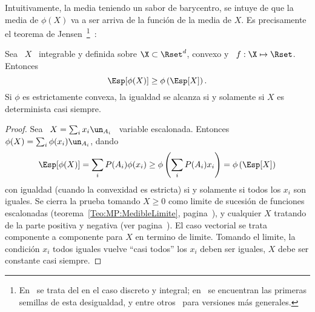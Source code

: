 %
Intuitivamente, la  media teniendo un sabor  de barycentro, se intuye  de que la
media  de $\phi(X)$ va  a ser  arriva de  la funci\'on  de la  media de  $X$. Es
precisamente el  teorema de Jensen~\footnote{En~\cite{Jen06} se trata  del en el
  caso discreto  y integral; en~\cite{Hol89,  Had93} se encuentran  las primeras
  semillas de  esta desigualdad,  y entre otros~\cite{Jes31:I,  Jes31:II, Per74,
    Rud91}  para versiones  m\'as generales.\label{Foot:SZ:Jensen}}~\cite{Jen06,
 Fel71, Bre88, AshDol99, AthLah06, Coh13}:
%
\begin{teorema}
\label{Teo:MP:Jensen}
%
  Sea \ $X$ \ integrable y definida  sobre $\X \subset \Rset^d$, convexo y \ $f:
  \X \mapsto \Rset$. Entonces
  \[
  \Esp[\phi(X)] \ge \phi\left( \Esp[X] \right).
  \]
  Si $\phi$ es  estrictamente convexa, la igualdad se alcanza  si y solamente si
  $X$ es determinista casi siempre.
\end{teorema}
%
\begin{proof}
  Sea \ $X = \sum_i x_i  \un_{A_i}$ \ variable escalonada. Entonces \ $\phi(X) =
  \sum_i \phi(x_i) \un_{A_i}$, dando
  \[
  \Esp[\phi(X)]  = \sum_i  P(A_i)  \phi(x_i) \ge  \phi\left(  \sum_i P(A_i)  x_i
  \right) = \phi\left( \Esp[X] \right)
  \]
  con igualdad  (cuando la convexidad es  estricta) si y solamente  si todos los
  $x_i$  son iguales.  Se  cierra la  prueba tomando  $X \ge  0$ como  limite de
  sucesi\'on   de   funciones  escalonadas   (teorema~\ref{Teo:MP:MedibleLimite},
  pagina~\pageref{Teo:MP:MedibleLimite}),  y cualquier $X$  tratando de  la parte
  positiva  y  negativa  (ver  pagina~\pageref{Teo:MP:MedibleLimite}).   El  caso
  vectorial  se   trata  componente  a   componente  para  $X$  en   termino  de
  limite. Tomando  el limite, la  condici\'on $x_i$ todos iguales  vuelve ``casi
  todos'' los $x_i$ deben ser iguales, \ie $X$ debe ser constante casi siempre.
\end{proof}

